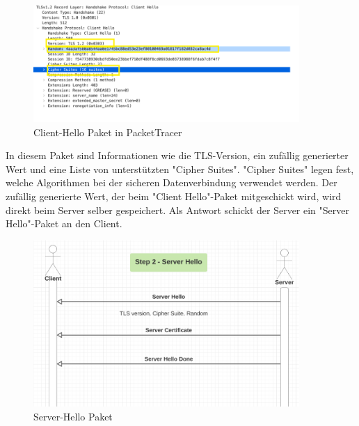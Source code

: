 \begin{figure}[H]
    \centering
    \includegraphics[width=0.9\textwidth]{media/OpenSSL/pt.png}
    \caption{Client-Hello Paket in PacketTracer \cite{DeepDiveTLS}}
\end{figure}

In diesem Paket sind Informationen wie die TLS-Version, ein zufällig generierter Wert und eine Liste von unterstützten "Cipher Suites". "Cipher Suites" legen fest, welche Algorithmen bei der sicheren Datenverbindung verwendet werden. Der zufällig generierte Wert, der beim "Client Hello"-Paket mitgeschickt wird, wird direkt beim Server selber gespeichert. Als Antwort schickt der Server ein "Server Hello"-Paket an den Client. 

\begin{figure}[H]
    \centering
    \includegraphics[width=0.9\textwidth]{media/OpenSSL/hello.png}
    \caption{Server-Hello Paket \cite{DeepDiveTLS}} 
\end{figure}


